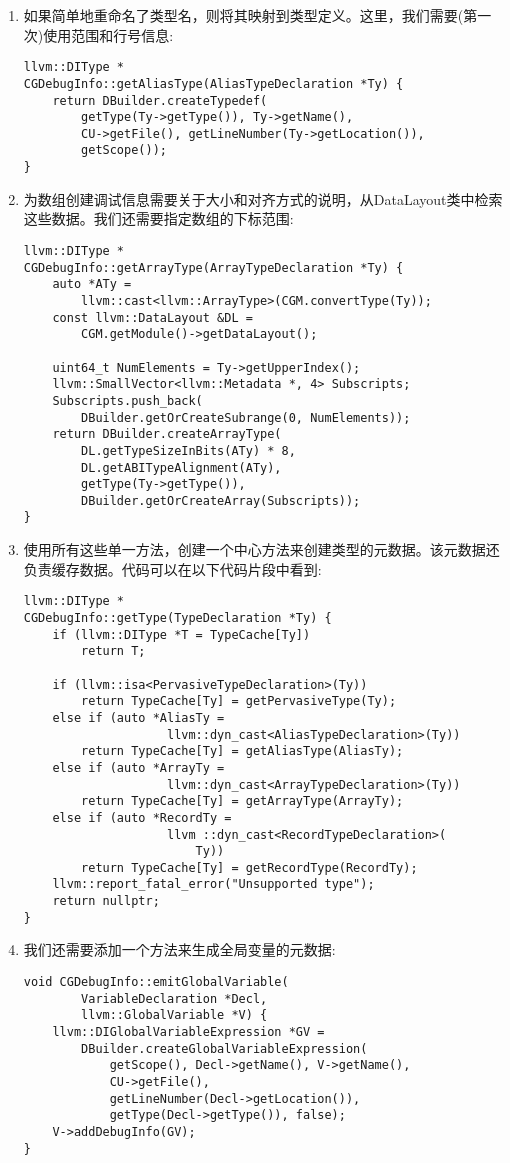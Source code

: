 \begin{enumerate}
\item 如果简单地重命名了类型名，则将其映射到类型定义。这里，我们需要(第一次)使用范围和行号信息:
\begin{lstlisting}[caption={}]
llvm::DIType *
CGDebugInfo::getAliasType(AliasTypeDeclaration *Ty) {
	return DBuilder.createTypedef(
		getType(Ty->getType()), Ty->getName(),
		CU->getFile(), getLineNumber(Ty->getLocation()),
		getScope());
}
\end{lstlisting}

\item 为数组创建调试信息需要关于大小和对齐方式的说明，从DataLayout类中检索这些数据。我们还需要指定数组的下标范围:
\begin{lstlisting}[caption={}]
llvm::DIType *
CGDebugInfo::getArrayType(ArrayTypeDeclaration *Ty) {
	auto *ATy =
		llvm::cast<llvm::ArrayType>(CGM.convertType(Ty));
	const llvm::DataLayout &DL =
		CGM.getModule()->getDataLayout();
		
	uint64_t NumElements = Ty->getUpperIndex();
	llvm::SmallVector<llvm::Metadata *, 4> Subscripts;
	Subscripts.push_back(
		DBuilder.getOrCreateSubrange(0, NumElements));
	return DBuilder.createArrayType(
		DL.getTypeSizeInBits(ATy) * 8,
		DL.getABITypeAlignment(ATy),
		getType(Ty->getType()),
		DBuilder.getOrCreateArray(Subscripts));
}
\end{lstlisting}

\item 使用所有这些单一方法，创建一个中心方法来创建类型的元数据。该元数据还负责缓存数据。代码可以在以下代码片段中看到:
\begin{lstlisting}[caption={}]
llvm::DIType *
CGDebugInfo::getType(TypeDeclaration *Ty) {
	if (llvm::DIType *T = TypeCache[Ty])
		return T;
	
	if (llvm::isa<PervasiveTypeDeclaration>(Ty))
		return TypeCache[Ty] = getPervasiveType(Ty);
	else if (auto *AliasTy =
					llvm::dyn_cast<AliasTypeDeclaration>(Ty))
		return TypeCache[Ty] = getAliasType(AliasTy);
	else if (auto *ArrayTy =
					llvm::dyn_cast<ArrayTypeDeclaration>(Ty))
		return TypeCache[Ty] = getArrayType(ArrayTy);
	else if (auto *RecordTy =
					llvm ::dyn_cast<RecordTypeDeclaration>(
						Ty))
		return TypeCache[Ty] = getRecordType(RecordTy);
	llvm::report_fatal_error("Unsupported type");
	return nullptr;
}
\end{lstlisting}

\item 我们还需要添加一个方法来生成全局变量的元数据:
\begin{lstlisting}[caption={}]
void CGDebugInfo::emitGlobalVariable(
		VariableDeclaration *Decl,
		llvm::GlobalVariable *V) {
	llvm::DIGlobalVariableExpression *GV =	
		DBuilder.createGlobalVariableExpression(
			getScope(), Decl->getName(), V->getName(),
			CU->getFile(),
			getLineNumber(Decl->getLocation()),
			getType(Decl->getType()), false);
	V->addDebugInfo(GV);
}
\end{lstlisting}


\end{enumerate}
